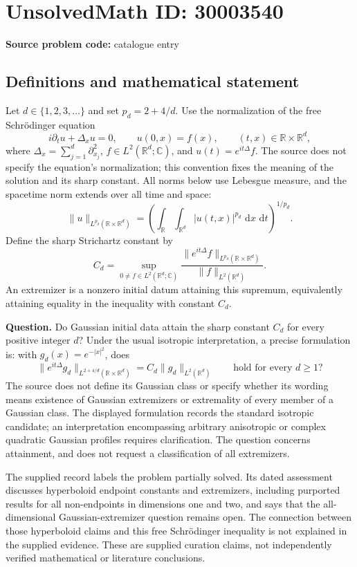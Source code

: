 \documentclass[11pt]{article}
\newcommand{\R}{\mathbb{R}}
\newcommand{\C}{\mathbb{C}}
\newcommand{\dd}{\,\mathrm{d}}
\begin{document}
\section*{UnsolvedMath ID: 30003540}
\textbf{Source problem code:} catalogue entry
\subsection{Definitions and mathematical statement}
Let \(d\in\{1,2,3,\ldots\}\) and set \(p_d=2+4/d\). Use the normalization of the free Schrödinger equation
\[
 i\partial_tu+\Delta_xu=0,\qquad u(0,x)=f(x),\qquad (t,x)\in\R\times\R^d,
\]
where \(\Delta_x=\sum_{j=1}^d\partial_{x_j}^2\), \(f\in L^2(\R^d;\C)\), and \(u(t)=e^{it\Delta}f\). The source does not specify the equation's normalization; this convention fixes the meaning of the solution and its sharp constant. All norms below use Lebesgue measure, and the spacetime norm extends over all time and space:
\[
 \|u\|_{L^{p_d}(\R\times\R^d)}
 =\left(\int_{\R}\int_{\R^d}|u(t,x)|^{p_d}\,\dd x\,\dd t\right)^{1/p_d}.
\]
Define the sharp Strichartz constant by
\[
 C_d=\sup_{0\ne f\in L^2(\R^d;\C)}
 \frac{\|e^{it\Delta}f\|_{L^{p_d}(\R\times\R^d)}}{\|f\|_{L^2(\R^d)}}.
\]
An extremizer is a nonzero initial datum attaining this supremum, equivalently attaining equality in the inequality with constant \(C_d\).

\textbf{Question.} Do Gaussian initial data attain the sharp constant \(C_d\) for every positive integer \(d\)? Under the usual isotropic interpretation, a precise formulation is: with \(g_d(x)=e^{-|x|^2}\), does
\[
 \|e^{it\Delta}g_d\|_{L^{2+4/d}(\R\times\R^d)}
 =C_d\|g_d\|_{L^2(\R^d)}
 \qquad\text{hold for every }d\geq1?
\]
The source does not define its Gaussian class or specify whether its wording means existence of Gaussian extremizers or extremality of every member of a Gaussian class. The displayed formulation records the standard isotropic candidate; an interpretation encompassing arbitrary anisotropic or complex quadratic Gaussian profiles requires clarification. The question concerns attainment, and does not request a classification of all extremizers.

The supplied record labels the problem partially solved. Its dated assessment discusses hyperboloid endpoint constants and extremizers, including purported results for all non-endpoints in dimensions one and two, and says that the all-dimensional Gaussian-extremizer question remains open. The connection between those hyperboloid claims and this free Schrödinger inequality is not explained in the supplied evidence. These are supplied curation claims, not independently verified mathematical or literature conclusions.
\end{document}
